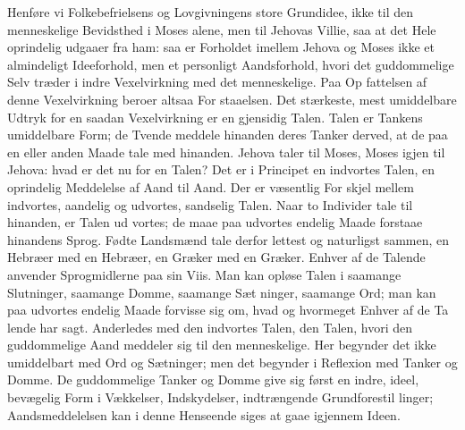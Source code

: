 \documentclass[12pt]{book}
\newcommand{\opage}[1]{\marginnote{\footnotesize\textit{[#1]}}}
\begin{document}
Henføre vi Folkebefrielsens og Lovgivningens store
Grundidee, ikke til den menneskelige Bevidsthed i Moses
alene, men til Jehovas Villie, saa at det Hele oprindelig
udgaaer fra ham: saa er Forholdet imellem Jehova og
Moses ikke et almindeligt Ideeforhold, men et personligt
Aandsforhold, hvori det guddommelige Selv træder i
indre Vexelvirkning med det menneskelige. Paa Op\-%
fattelsen af denne Vexelvirkning beroer altsaa For\-%
staaelsen. Det stærkeste, mest umiddelbare Udtryk for
en saadan Vexelvirkning er en gjensidig Talen. Talen
er Tankens umiddelbare Form; de Tvende meddele
hinanden deres Tanker derved, at de paa en eller anden
Maade tale med hinanden. Jehova taler til Moses,
Moses igjen til Jehova: hvad er det nu for en Talen?
Det er i Principet en indvortes Talen, en oprindelig
Meddelelse af Aand til Aand. Der er væsentlig For\-%
skjel mellem indvortes, aandelig og udvortes, sandselig
Talen. Naar to Individer tale til hinanden, er Talen ud\-%
vortes; de maae paa udvortes endelig Maade forstaae
hinandens Sprog. Fødte Landsmænd tale derfor lettest
og naturligst sammen, en Hebræer med en Hebræer, en
Græker med en Græker. Enhver af de Talende anvender
Sprogmidlerne paa sin Viis. Man kan opløse Talen i
saamange Slutninger, saamange Domme, saamange Sæt\-%
ninger, saamange Ord; man kan paa udvortes endelig
Maade forvisse sig om, hvad og hvormeget Enhver af de Ta\-%
lende har sagt. Anderledes med den indvortes Talen, den
\opage{186}\setcounter{footnote}{0}%
Talen, hvori den guddommelige Aand meddeler sig til
den menneskelige. Her begynder det ikke umiddelbart
med Ord og Sætninger; men det begynder i Reflexion
med Tanker og Domme. De guddommelige Tanker og
Domme give sig først en indre, ideel, bevægelig Form
i Vækkelser, Indskydelser, indtrængende Grundforestil\-%
linger; Aandsmeddelelsen kan i denne Henseende siges
at gaae igjennem Ideen.
\end{document}
